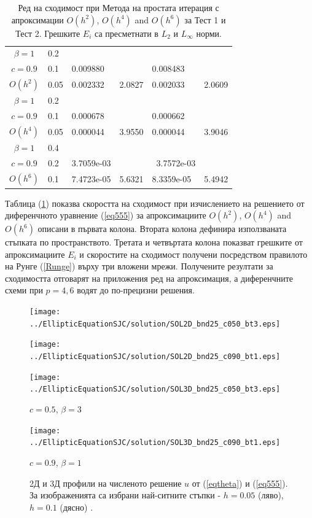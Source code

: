 \documentclass{article}
\newcommand{\rf}[1]{(\ref{#1})}
\begin{document}
\begin{table}[ht]
\begin{tabular}{||c|l|ll|ll||}
			\hline
			\hline 	
$\beta = 1$   	&0.2   &             &           &                & \\
     $c=0.9$     &0.1   & 0.009880  &             & 0.008483      &    \\
     $O(h^2)$	&0.05  & 0.002332 & 2.0827       & 0.002033      & 2.0609  \\
\hline 	
 $\beta = 1$   	&0.2  &            &               &               &     \\
     $c=0.9$  	&0.1   & 0.000678  &              & 0.000662      &        \\
     $O(h^4)$	&0.05  & 0.000044 &3.9550        & 0.000044 &  3.9046        \\
    \hline
 $\beta = 1$	&0.4   &             &        &               &        \\
   $ c=0.9$  	&0.2   &  3.7059e-03  &        &~3.7572e-03     &       \\
       $O(h^6)$	&0.1  &  7.4723e-05 &5.6321  & 8.3359e-05&   5.4942       \\
	   \hline
			\hline 
		\end{tabular}
		\caption{Ред на сходимост при Метода на простата итерация с апроксимации $O(h^{2})$, $O(h^{4})$ and $O(h^{6})$ за Тест  1 и Тест 2. Грешките $E_i$ са пресметнати в $L_2$ и $L_\infty$ норми.}

\label{tab:a}
\end{table}
Таблица \rf{tab:a} показва скоростта на сходимост при изчислението на решението от диференчното уравнение \rf{eq555} за апроксимациите $O(h^{2})$, $O(h^{4})$ and $O(h^{6})$ описани в първата колона. Втората колона дефинира използваната стъпката по пространството. Третата и четвъртата колона показват грешките от апроксимациите $E_i$ и скоростите на сходимост получени посредством правилото на Рунге \rf{Runge} върху три вложени мрежи. Получените резултати за сходимостта отговарят на приложения ред на апроксимация, а диференчните схеми при $p=4,6$ водят до по-прецизни решения.
\begin{figure}[ht]
	\begin{minipage}[b]{0.5\linewidth}
		\raggedright
		\texttt{[image: ../EllipticEquationSJC/solution/SOL2D\_bnd25\_c050\_bt3.eps]}
	\end{minipage}
	\begin{minipage}[b]{0.5\linewidth}
		\raggedleft
		\texttt{[image: ../EllipticEquationSJC/solution/SOL2D\_bnd25\_c090\_bt1.eps]}
	\end{minipage}
	\begin{minipage}[b]{0.5\linewidth}
		 \raggedright
		\texttt{[image: ../EllipticEquationSJC/solution/SOL3D\_bnd25\_c050\_bt3.eps]}
		\centerline{$c = 0.5$, $\beta = 3$}
	\end{minipage}
	\begin{minipage}[b]{0.45\linewidth}
		 \raggedleft
		\texttt{[image: ../EllipticEquationSJC/solution/SOL3D\_bnd25\_c090\_bt1.eps]}
		\centerline{$c = 0.9$, $\beta = 1$}
	\end{minipage}
	\caption{2Д и 3Д профили на численото решение $u$ от \rf{eqtheta} и \rf{eq555}. За изображенията са избрани най-ситните стъпки - $h=0.05$ (ляво), $h=0.1$ (дясно) .}
	\label{fig:solutions}
\end{figure}
\end{document}
